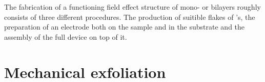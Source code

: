 The fabrication of a functioning field effect structure of \tmdg mono- or bilayers roughly consists of three different procedures. The production of suitible flakes of \tmd's, the preparation of an electrode both on the sample and in the substrate and the assembly of the full device on top of it. 

\section{Mechanical exfoliation}
\begin{figure}
\centering
\begin{subfigure}{0.4\textwidth}
	\caption{}
\end{subfigure}
\begin{subfigure}{0.349\textwidth}
	\caption{}
\end{subfigure}
\end{figure}
